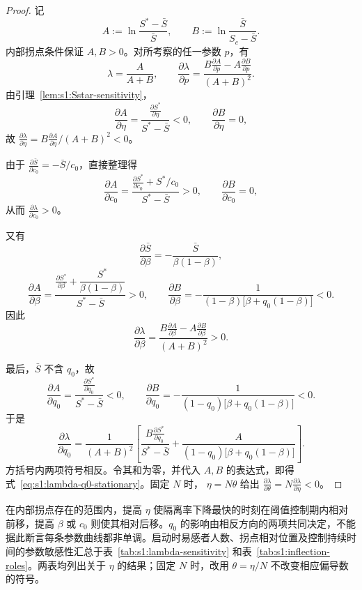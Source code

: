 \documentclass[UTF8,a4paper,10pt,fontset=fandol]{ctexart}
\theoremstyle{cnplain}
\theoremstyle{remark}
\numberwithin{equation}{section}
\begin{document}
\begin{proof}
记
\[
A:=
\ln\frac{S^*-\bar S}{\bar S},
\qquad
B:=
\ln\frac{\bar S}{S_c-\bar S}.
\]
内部拐点条件保证 $A,B>0$。对所考察的任一参数 $p$，有
\[
\lambda=\frac{A}{A+B},
\qquad
\frac{\partial \lambda}{\partial p}
=
\frac{B\frac{\partial A}{\partial p}-A\frac{\partial B}{\partial p}}{(A+B)^2}.
\]
由引理~\ref{lem:s1:Sstar-sensitivity}，
\[
\frac{\partial A}{\partial \eta}
=
\frac{\frac{\partial S^*}{\partial \eta}}{S^*-\bar S}<0,
\qquad
\frac{\partial B}{\partial \eta}=0,
\]
故 $\frac{\partial \lambda}{\partial \eta}=B\frac{\partial A}{\partial \eta}/(A+B)^2<0$。

由于 $\frac{\partial \bar S}{\partial c_0}=-\bar S/c_0$，直接整理得
\[
\frac{\partial A}{\partial c_0}
=
\frac{\frac{\partial S^*}{\partial c_0}+S^*/c_0}{S^*-\bar S}>0,
\qquad
\frac{\partial B}{\partial c_0}=0,
\]
从而 $\frac{\partial \lambda}{\partial c_0}>0$。

又有
\[
\frac{\partial \bar S}{\partial \beta}
=
-\frac{\bar S}{\beta(1-\beta)},
\]
\[
\frac{\partial A}{\partial \beta}
=
\frac{
\frac{\partial S^*}{\partial \beta}+\dfrac{S^*}{\beta(1-\beta)}
}{
S^*-\bar S
}>0,
\qquad
\frac{\partial B}{\partial \beta}
=
-\frac{1}{
(1-\beta)\bigl[\beta+q_0(1-\beta)\bigr]
}<0.
\]
因此
\[
\frac{\partial \lambda}{\partial \beta}
=
\frac{B\frac{\partial A}{\partial \beta}-A\frac{\partial B}{\partial \beta}}{(A+B)^2}>0.
\]

最后，$\bar S$ 不含 $q_0$，故
\[
\frac{\partial A}{\partial q_0}
=
\frac{\frac{\partial S^*}{\partial q_0}}{S^*-\bar S}<0,
\qquad
\frac{\partial B}{\partial q_0}
=
-\frac{1}{
(1-q_0)\bigl[\beta+q_0(1-\beta)\bigr]
}<0.
\]
于是
\[
\frac{\partial \lambda}{\partial q_0}
=
\frac{1}{(A+B)^2}
\left[
\frac{B \frac{\partial S^*}{\partial q_0}}{S^*-\bar S}
+
\frac{A}{
(1-q_0)\bigl[\beta+q_0(1-\beta)\bigr]
}
\right].
\]
方括号内两项符号相反。令其和为零，并代入 $A,B$ 的表达式，即得
式~\eqref{eq:s1:lambda-q0-stationary}。固定 $N$ 时，
$\eta=N\theta$ 给出 $\frac{\partial \lambda}{\partial \theta}=N\frac{\partial \lambda}{\partial \eta}<0$。
\end{proof}


在内部拐点存在的范围内，提高 $\eta$ 使隔离率下降最快的时刻在阈值控制期内相对前移，提高 $\beta$ 或 $c_0$ 则使其相对后移。$q_0$ 的影响由相反方向的两项共同决定，不能据此断言每条参数曲线都非单调。启动时易感者人数、拐点相对位置及控制持续时间的参数敏感性汇总于表~\ref{tab:s1:lambda-sensitivity} 和表~\ref{tab:s1:inflection-roles}。两表均列出关于 $\eta$ 的结果；固定 $N$ 时，改用 $\theta=\eta/N$ 不改变相应偏导数的符号。
\end{document}
